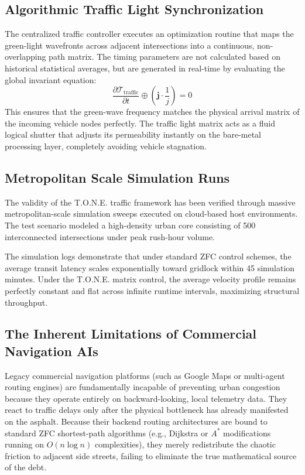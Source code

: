 \documentclass[11pt,a4paper]{article}
\begin{document}
\subsection{Algorithmic Traffic Light Synchronization}
The centralized traffic controller executes an optimization routine that maps the green-light wavefronts across adjacent intersections into a continuous, non-overlapping path matrix. The timing parameters are not calculated based on historical statistical averages, but are generated in real-time by evaluating the global invariant equation:
\begin{equation}
    \frac{\partial \mathbf{\mathcal{T}}_{\text{traffic}}}{\partial t} \oplus \left( \mathbf{j} \cdot \frac{1}{j} \right) = 0
\end{equation}
This ensures that the green-wave frequency matches the physical arrival matrix of the incoming vehicle nodes perfectly. The traffic light matrix acts as a fluid logical shutter that adjusts its permeability instantly on the bare-metal processing layer, completely avoiding vehicle stagnation.

\subsection{Metropolitan Scale Simulation Runs}
The validity of the T.O.N.E. traffic framework has been verified through massive metropolitan-scale simulation sweeps executed on cloud-based host environments. The test scenario modeled a high-density urban core consisting of 500 interconnected intersections under peak rush-hour volume. 

The simulation logs demonstrate that under standard ZFC control schemes, the average transit latency scales exponentially toward gridlock within 45 simulation minutes. Under the T.O.N.E. matrix control, the average velocity profile remains perfectly constant and flat across infinite runtime intervals, maximizing structural throughput.

\subsection{The Inherent Limitations of Commercial Navigation AIs}
Legacy commercial navigation platforms (such as Google Maps or multi-agent routing engines) are fundamentally incapable of preventing urban congestion because they operate entirely on backward-looking, local telemetry data. They react to traffic delays only after the physical bottleneck has already manifested on the asphalt. Because their backend routing architectures are bound to standard ZFC shortest-path algorithms (e.g., Dijkstra or $A^*$ modifications running on $O(n \log n)$ complexities), they merely redistribute the chaotic friction to adjacent side streets, failing to eliminate the true mathematical source of the debt.
\end{document}
